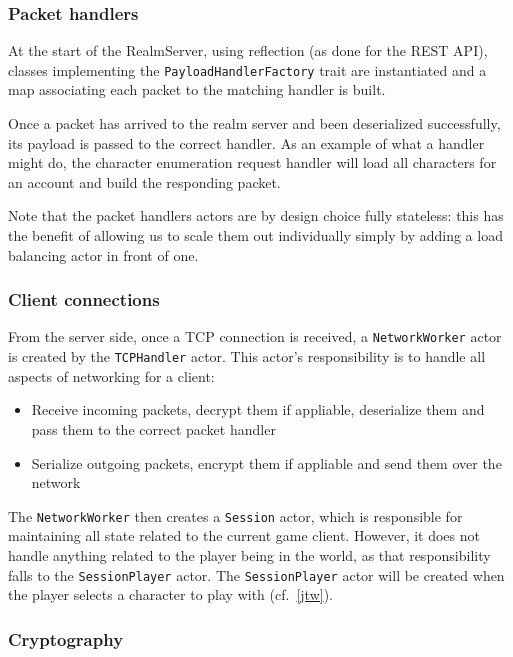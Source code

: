 \documentclass[paper=a4, fontsize=11pt]{scrartcl}
\begin{document}
\subsubsection{Packet handlers}

At the start of the RealmServer, using reflection (as done for the REST API),
classes implementing the \texttt{PayloadHandlerFactory} trait are instantiated
and a map associating each packet to the matching handler is built.

Once a packet has arrived to the realm server and been deserialized
successfully, its payload is passed to the correct handler.
As an example of what a handler might do, the character enumeration request
handler will load all characters for an account and build the responding packet.

Note that the packet handlers actors are by design choice fully stateless: this
has the benefit of allowing us to scale them out individually simply by adding a
load balancing actor in front of one.

\subsubsection{Client connections}

From the server side, once a TCP connection is received, a
\texttt{NetworkWorker} actor is created by the \texttt{TCPHandler} actor.
This actor's responsibility is to handle all aspects of networking for a client:
\begin{itemize}
    \item Receive incoming packets, decrypt them if appliable, deserialize them
        and pass them to the correct packet handler
    \item Serialize outgoing packets, encrypt them if appliable and send them
        over the network
\end{itemize}

The \texttt{NetworkWorker} then creates a \texttt{Session} actor, which is
responsible for maintaining all state related to the current game client.
However, it does not handle anything related to the player being in the world,
as that responsibility falls to the \texttt{SessionPlayer} actor.
The \texttt{SessionPlayer} actor will be created when the player selects a
character to play with (cf.~\ref{jtw}).

\subsubsection{Cryptography}
\end{document}
